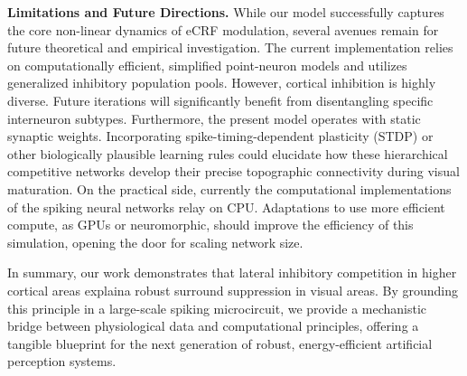 \label{sec:disc_limitations}
\textbf{Limitations and Future Directions.} While our model successfully captures the core non-linear dynamics of eCRF modulation, several avenues remain for future theoretical and empirical investigation. The current implementation relies on computationally efficient, simplified point-neuron models and utilizes generalized inhibitory population pools. However, cortical inhibition is highly diverse. Future iterations will significantly benefit from disentangling specific interneuron subtypes. Furthermore, the present model operates with static synaptic weights. Incorporating spike-timing-dependent plasticity (STDP) or other biologically plausible learning rules could elucidate how these hierarchical competitive networks develop their precise topographic connectivity during visual maturation. On the practical side, currently the computational implementations of the spiking neural networks relay on CPU. Adaptations to use more efficient compute, as GPUs or neuromorphic, should improve the efficiency of this simulation, opening the door for scaling network size.

%
In summary, our work demonstrates that lateral inhibitory competition in higher cortical areas explaina robust surround suppression in visual areas. By grounding this principle in a large-scale spiking microcircuit, we provide a mechanistic bridge between physiological data and computational principles, offering a tangible blueprint for the next generation of robust, energy-efficient artificial perception systems.